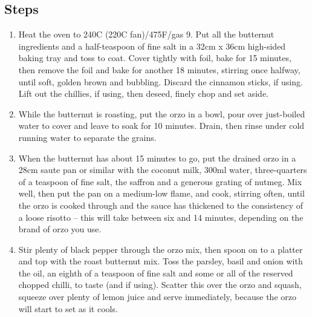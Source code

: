 \documentclass{book}
\begin{document}
\subsection*{Steps}
\begin{enumerate}
\item Heat the oven to 240C (220C fan)/475F/gas 9. Put all the butternut ingredients and a half-teaspoon of fine salt in a 32cm x 36cm high-sided baking tray and toss to coat. Cover tightly with foil, bake for 15 minutes, then remove the foil and bake for another 18 minutes, stirring once halfway, until soft, golden brown and bubbling. Discard the cinnamon sticks, if using. Lift out the chillies, if using, then deseed, finely chop and set aside.
\item While the butternut is roasting, put the orzo in a bowl, pour over just-boiled water to cover and leave to soak for 10 minutes. Drain, then rinse under cold running water to separate the grains.
\item When the butternut has about 15 minutes to go, put the drained orzo in a 28cm saute pan or similar with the coconut milk, 300ml water, three-quarters of a teaspoon of fine salt, the saffron and a generous grating of nutmeg. Mix well, then put the pan on a medium-low flame, and cook, stirring often, until the orzo is cooked through and the sauce has thickened to the consistency of a loose risotto – this will take between six and 14 minutes, depending on the brand of orzo you use.
\item Stir plenty of black pepper through the orzo mix, then spoon on to a platter and top with the roast butternut mix. Toss the parsley, basil and onion with the oil, an eighth of a teaspoon of fine salt and some or all of the reserved chopped chilli, to taste (and if using). Scatter this over the orzo and squash, squeeze over plenty of lemon juice and serve immediately, because the orzo will start to set as it cools.
\end{enumerate}
\newpage
\end{document}

